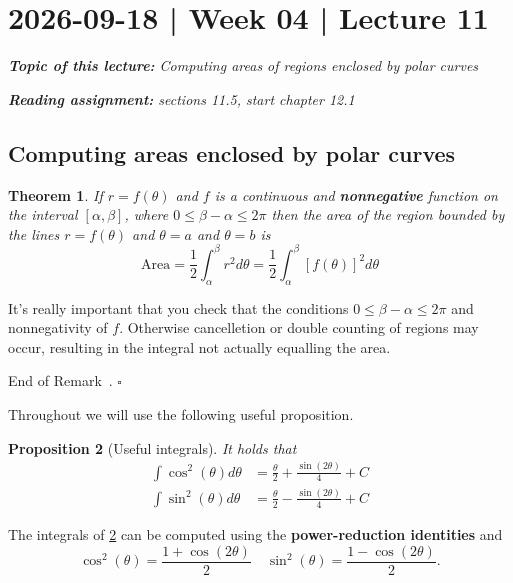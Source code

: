 \documentclass[10pt]{article}
\newtheorem{theorem}{Theorem}
\newtheorem{proposition}[theorem]{Proposition}
\newtheorem{remark}[theorem]{Remark}
\theoremstyle{definition}
\renewenvironment{remark}
{\begin{oldremark}} 
  {\par\smallskip\hfill   End of Remark~\theremark. $\square$    \par\end{oldremark}}
\newcommand{\1}[1]{\textbf{1}_{\left[#1\right]}} %
\begin{document}
\newpage
\section{2026-09-18 | Week 04 | Lecture 11}

\begin{center}
  \begin{tcolorbox}[width=0.9\textwidth, colback=white, colframe=black]
    \textit{\textbf{Topic of this lecture:} Computing areas of regions
      enclosed by polar curves}

    \textit{\textbf{Reading assignment:} sections 11.5, start chapter 12.1}
  \end{tcolorbox}
\end{center}

\subsection{Computing areas enclosed by polar curves}

\begin{theorem}\label{thm:polar-area-theorem}
  If $r=f(\theta)$ and $f$ is a continuous and \textbf{nonnegative} function on the interval $[\alpha,\beta]$, where $0
  \leq \beta-\alpha \leq 2\pi$ then the area of the region bounded by the
  lines $r =f(\theta)$ and $\theta=a$ and $\theta = b$ is
  \begin{equation*}
    \text{Area} = \frac{1}{2}\int_{\alpha}^{\beta}r^{2}d\theta =  \frac{1}{2} \int_{\alpha}^{\beta}\left[ f(\theta) \right]^{2}d\theta   
  \end{equation*}
\end{theorem}
\begin{remark}
  It's really important that you check that the conditions $0 \leq \beta - \alpha \leq 2\pi$ and
  nonnegativity of $f$. Otherwise cancelletion or double counting of regions may occur, resulting in the
  integral not actually equalling the area.
\end{remark}

Throughout we will use the following useful proposition.

\begin{proposition}[Useful integrals]
  \label{prop:useful-integrals}
  It holds that
  \begin{align*}
    \int \cos^{2}(\theta)d\theta  &= \frac{\theta}{2}+\frac{\sin(2\theta)}{4}+C\\
    \int \sin^{2}(\theta)d\theta  &= \frac{\theta}{2}-\frac{\sin(2\theta)}{4}+C
  \end{align*}
\end{proposition}
The integrals of \cref{prop:useful-integrals} can be computed using the
\textbf{power-reduction identities} and
\begin{equation*}
  \cos^{2}(\theta) = \frac{1+\cos(2\theta)}{2} \quad \sin^{2}(\theta) = \frac{1-\cos(2\theta)}{2}.
\end{equation*}
\end{document}
